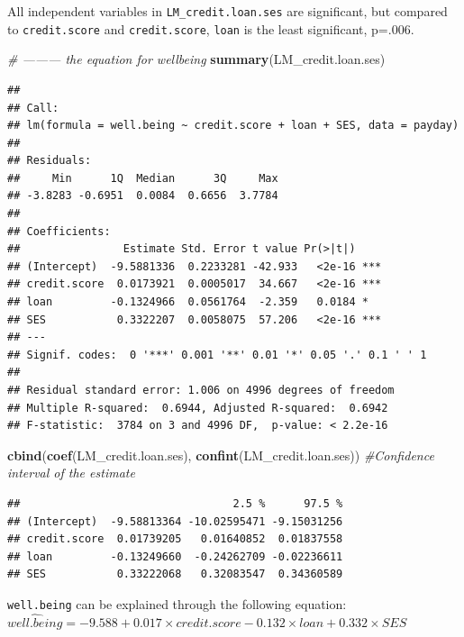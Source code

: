 \documentclass[]{article}
\newenvironment{Shaded}{\begin{snugshade}}{\end{snugshade}}
\newcommand{\CommentTok}[1]{\textcolor[rgb]{0.56,0.35,0.01}{\textit{#1}}}
\newcommand{\KeywordTok}[1]{\textcolor[rgb]{0.13,0.29,0.53}{\textbf{#1}}}
\newcommand{\NormalTok}[1]{#1}
\begin{document}
All independent variables in \texttt{LM\_credit.loan.ses} are
significant, but compared to \texttt{credit.score} and
\texttt{credit.score}, \texttt{loan} is the least significant, p=.006.

\begin{Shaded}
\begin{Highlighting}[]
\CommentTok{# --------- the equation for wellbeing}
\KeywordTok{summary}\NormalTok{(LM_credit.loan.ses)}
\end{Highlighting}
\end{Shaded}

\begin{verbatim}
## 
## Call:
## lm(formula = well.being ~ credit.score + loan + SES, data = payday)
## 
## Residuals:
##     Min      1Q  Median      3Q     Max 
## -3.8283 -0.6951  0.0084  0.6656  3.7784 
## 
## Coefficients:
##                Estimate Std. Error t value Pr(>|t|)    
## (Intercept)  -9.5881336  0.2233281 -42.933   <2e-16 ***
## credit.score  0.0173921  0.0005017  34.667   <2e-16 ***
## loan         -0.1324966  0.0561764  -2.359   0.0184 *  
## SES           0.3322207  0.0058075  57.206   <2e-16 ***
## ---
## Signif. codes:  0 '***' 0.001 '**' 0.01 '*' 0.05 '.' 0.1 ' ' 1
## 
## Residual standard error: 1.006 on 4996 degrees of freedom
## Multiple R-squared:  0.6944, Adjusted R-squared:  0.6942 
## F-statistic:  3784 on 3 and 4996 DF,  p-value: < 2.2e-16
\end{verbatim}

\begin{Shaded}
\begin{Highlighting}[]
\KeywordTok{cbind}\NormalTok{(}\KeywordTok{coef}\NormalTok{(LM_credit.loan.ses), }\KeywordTok{confint}\NormalTok{(LM_credit.loan.ses)) }\CommentTok{#Confidence interval of the estimate}
\end{Highlighting}
\end{Shaded}

\begin{verbatim}
##                                 2.5 %      97.5 %
## (Intercept)  -9.58813364 -10.02595471 -9.15031256
## credit.score  0.01739205   0.01640852  0.01837558
## loan         -0.13249660  -0.24262709 -0.02236611
## SES           0.33222068   0.32083547  0.34360589
\end{verbatim}

\texttt{well.being} can be explained through the following equation:
\(\widehat{well.being} = -9.588 + 0.017 \times credit.score - 0.132 \times loan + 0.332 \times SES\)
\end{document}
